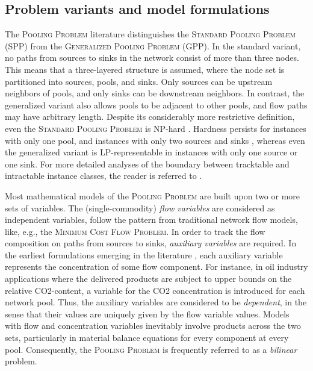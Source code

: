 \documentclass[pdflatex,sn-mathphys-num]{sn-jnl}%
\theoremstyle{thmstyleone}%
\begin{document}
\subsection{Problem variants and model formulations} \label{sec:form}

The \textsc{Pooling Problem} literature distinguishes the \textsc{Standard Pooling Problem} (SPP)
from the \textsc{Generalized Pooling Problem} (GPP).
In the standard variant, no paths from sources to sinks in the network consist of more than three nodes.
This means that a three-layered structure is assumed, where the node set is partitioned into sources, pools, and sinks.
Only sources can be upstream neighbors of pools, and only sinks can be downstream neighbors.
In contrast, the generalized variant also allows pools to be adjacent to other pools, and flow paths may have arbitrary length. 
Despite its considerably more restrictive definition, even the \textsc{Standard Pooling Problem} is NP-hard \cite{alfaki13a}.
Hardness persists for instances with only one pool, and instances with only two sources and sinks \cite{haugland16a},
whereas even the generalized variant is LP-representable in instances with only one source or one sink.
For more detailed analyses of the boundary between tracktable and intractable instance classes,
the reader is referred to \cite{haugland16b,boland17,baltean18}.

Most mathematical models of the \textsc{Pooling Problem} are built upon two or more sets of variables.
The (single-commodity) \emph{flow variables} are considered as independent variables,
follow the pattern from traditional network flow models, like, e.g., the \textsc{Minimum Cost Flow Problem}.
In order to track the flow composition on paths from sources to sinks, \emph{auxiliary variables} are required.
In the earliest formulations emerging in the literature \cite{haverly78,baker85},
each auxiliary variable represents the concentration of some flow component.
For instance, in oil industry applications where the delivered products are subject to upper bounds on the relative CO2-content,
a variable for the CO2 concentration is introduced for each network pool.
Thus, the auxiliary variables are considered to be \emph{dependent},
in the sense that their values are uniquely given by the flow variable values.
Models with flow and concentration variables inevitably involve products across the two sets,
particularly in material balance equations for every component at every pool.
Consequently, the \textsc{Pooling Problem} is frequently referred to as a \emph{bilinear} problem.
\end{document}
